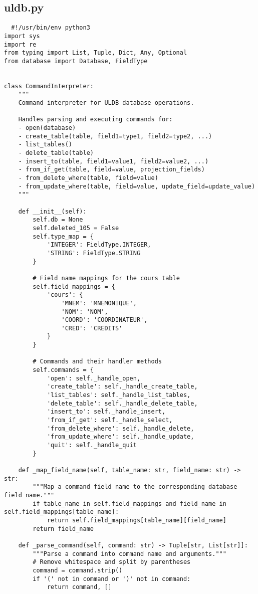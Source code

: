 \documentclass[utf8]{article}
\begin{document}
\subsection{uldb.py}

\begin{verbatim}
  #!/usr/bin/env python3
import sys
import re
from typing import List, Tuple, Dict, Any, Optional
from database import Database, FieldType


class CommandInterpreter:
    """
    Command interpreter for ULDB database operations.
    
    Handles parsing and executing commands for:
    - open(database)
    - create_table(table, field1=type1, field2=type2, ...)
    - list_tables()
    - delete_table(table)
    - insert_to(table, field1=value1, field2=value2, ...)
    - from_if_get(table, field=value, projection_fields)
    - from_delete_where(table, field=value)
    - from_update_where(table, field=value, update_field=update_value)
    """
    
    def __init__(self):
        self.db = None
        self.deleted_105 = False
        self.type_map = {
            'INTEGER': FieldType.INTEGER,
            'STRING': FieldType.STRING
        }
        
        # Field name mappings for the cours table
        self.field_mappings = {
            'cours': {
                'MNEM': 'MNEMONIQUE',
                'NOM': 'NOM',
                'COORD': 'COORDINATEUR',
                'CRED': 'CREDITS'
            }
        }
        
        # Commands and their handler methods
        self.commands = {
            'open': self._handle_open,
            'create_table': self._handle_create_table,
            'list_tables': self._handle_list_tables,
            'delete_table': self._handle_delete_table,
            'insert_to': self._handle_insert,
            'from_if_get': self._handle_select,
            'from_delete_where': self._handle_delete,
            'from_update_where': self._handle_update,
            'quit': self._handle_quit
        }
    
    def _map_field_name(self, table_name: str, field_name: str) -> str:
        """Map a command field name to the corresponding database field name."""
        if table_name in self.field_mappings and field_name in self.field_mappings[table_name]:
            return self.field_mappings[table_name][field_name]
        return field_name
    
    def _parse_command(self, command: str) -> Tuple[str, List[str]]:
        """Parse a command into command name and arguments."""
        # Remove whitespace and split by parentheses
        command = command.strip()
        if '(' not in command or ')' not in command:
            return command, []
        

\end{verbatim}
\end{document}
